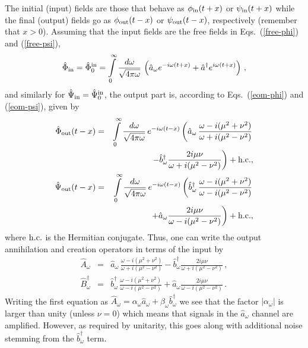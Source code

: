 \documentclass[aps,prd,showpacs,amssymb,nofootinbib,twocolumn]{revtex4}
\newcommand{\nn}{\nonumber\\}
\newcommand{\bea}{\begin{eqnarray}}
\newcommand{\eea}{\end{eqnarray}}
\begin{document}
The initial (input) fields are those that behave as $\phi_{\rm in}(t+x)$ or 
$\psi_{\rm in}(t+x)$
while the final (output) fields go as $\phi_{\rm out}(t-x)$ or 
$\psi_{\rm out}(t-x)$, respectively (remember that $x>0$). 
%
Assuming that the input fields are the free fields in Eqs.~(\ref{free-phi})
and (\ref{free-psi}), 
%
\bea
\hat\Phi_{\rm in}
=
\hat\Phi^{\rm in}_0 
= 
\int\limits_0^\infty 
\frac{d\omega}{\sqrt{4\pi\omega}}\,
\left(\hat a_\omega e^{-i\omega(t+x)}+\hat a^\dagger e^{i\omega (t+x)}\right) 
\,,
\eea
%
and similarly for $\hat\Psi_{\rm in}=\hat\Psi^{\rm in}_0$, the output part is,
according to Eqs.~(\ref{eom-phi}) and (\ref{eom-psi}), given by
%
\bea
\hat\Phi_{\rm out}(t-x)  
&=& 
\int\limits_0^\infty
\frac{d\omega}{\sqrt{4\pi\omega}}\,
e^{-i\omega (t-x)}
\left(\hat a_\omega\,\frac{\omega-i(\mu^2+\nu^2)}{\omega+i(\mu^2-\nu^2)}
\right.
\nn
&&
\left.
- 
\hat b^\dagger_\omega 
\frac{2i\mu\nu}{\omega+i(\mu^2-\nu^2)}
\right) 
+{\rm h.c.,}
\\
\hat\Psi_{\rm out}(t-x)  
&=& 
\int\limits_0^\infty
\frac{d\omega}{\sqrt{4\pi\omega}}\,
e^{-i\omega (t-x)}
\left(\hat b^\dagger_\omega \,
\frac{\omega-i(\mu^2+\nu^2)}{\omega-i(\mu^2-\nu^2)}
\right.
\nn
&&
\left.
+\hat a_\omega
\frac{2i\mu\nu}{\omega-i(\mu^2-\nu^2)}
\right) 
+{\rm h.c.,}
\eea
%
where $\rm h.c.$ is the Hermitian conjugate. 
%
Thus, one can write the output annihilation and creation operators in terms 
of the input by
%
\bea
\hat A_\omega
&=& 
\hat a_\omega\,\frac{\omega-i(\mu^2+\nu^2)}{\omega+i(\mu^2-\nu^2)}
- 
\hat b^\dagger_\omega 
\frac{2i\mu\nu}{\omega+i(\mu^2-\nu^2)}
\,,
%
\\
\hat B^\dagger_\omega 
&=& 
\hat b^\dagger_\omega \,
\frac{\omega-i(\mu^2+\nu^2)}{\omega-i(\mu^2-\nu^2)}
+\hat a_\omega
\frac{2i\mu\nu}{\omega-i(\mu^2-\nu^2)}
\,.
\eea
%
Writing the first equation as 
$\hat A_\omega=\alpha_\omega\hat a_\omega+\beta_\omega\hat b^\dagger_\omega$ 
we see that the factor $|\alpha_\omega|$ is larger than unity 
(unless $\nu=0$) which means that signals in the $\hat a_\omega$ channel 
are amplified. 
%
However, as required by unitarity, this goes along with additional noise 
stemming from the $\hat b^\dagger_\omega$ term. 
\end{document}
